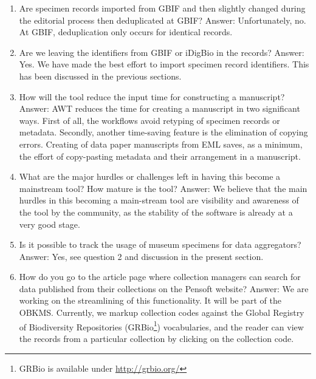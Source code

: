 \begin{enumerate}
\item{Are specimen records imported from GBIF and then slightly changed during the editorial process then deduplicated at GBIF? Answer: Unfortunately, no. At GBIF, deduplication only occurs for identical records.}
\item{Are we leaving the identifiers from GBIF or iDigBio in the records? Answer: Yes. We have made the best effort to import specimen record identifiers. This has been discussed in the previous sections.}
\item{How will the tool reduce the input time for constructing a manuscript? Answer: AWT reduces the time for creating a manuscript in two significant ways. First of all, the workflows avoid retyping of specimen records or metadata. Secondly, another time-saving feature is the elimination of copying errors. Creating of data paper manuscripts from EML saves, as a minimum, the effort of copy-pasting metadata and their arrangement in a manuscript.}
\item{What are the major hurdles or challenges left in having this become a mainstream tool? How mature is the tool? Answer: We believe that the main hurdles in this becoming a main-stream tool are visibility and awareness of the tool by the community, as the stability of the software is already at a very good stage.}
\item{Is it possible to track the usage of museum specimens for data aggregators? Answer: Yes, see question 2 and discussion in the present section.}
\item{How do you go to the article page where collection managers can search for data published from their collections on the Pensoft website? Answer: We are working on the streamlining of this functionality. It will be part of the OBKMS. Currently, we markup collection codes against the Global Registry of Biodiversity Repositories (GRBio\footnote{GRBio is available under \url{http://grbio.org/}}) vocabularies, and the reader can view the records from a particular collection by clicking on the collection code.}
\end{enumerate}